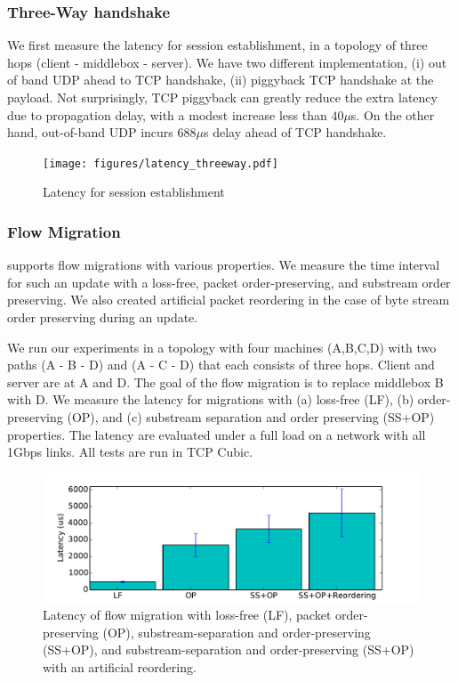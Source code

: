 \subsubsection{Three-Way handshake}
\label{sec:3way-handshake}

We first measure the latency for  session establishment, in a topology
of three  hops (client -  middlebox -  server). We have  two different
implementation, (i)  out of  band UDP  ahead   to TCP handshake,  (ii)
piggyback  TCP handshake   at  the   payload. Not surprisingly,    TCP
piggyback can   greatly reduce the extra    latency due to propagation
delay, with a modest increase less than $40 \mu $s. On the other hand,
out-of-band UDP incurs $688\mu$s delay ahead of TCP handshake.

\begin{figure}[ht]
\centering
\texttt{[image: figures/latency\_threeway.pdf]} 
\caption{\small Latency for session establishment}\label{threeway}
\end{figure}


\subsubsection{Flow Migration}

\system supports flow  migrations with various properties.  We measure
the time  interval for   such  an update   with a  loss-free,   packet
order-preserving,  and  substream order  preserving.  We  also created
artificial   packet  reordering in  the  case   of  byte stream  order
preserving during an update.


We run our experiments in a topology with four machines (A,B,C,D) with
two paths  (A - B -  D) and (A  - C - D)  that  each consists of three
hops. Client and server are at A and D. The goal of the flow migration
is   to replace  middlebox B   with  D. We   measure  the latency  for
migrations with (a) loss-free (LF), (b) order-preserving (OP), and (c)
substream separation   and order  preserving  (SS+OP)  properties. The
latency are  evaluated under a full  load on a  network with all 1Gbps
links. All tests are run in TCP Cubic.

\begin{figure}[ht]
\centering
\includegraphics[width=\linewidth]{figures/latency_four_types.pdf} 
\caption{\small Latency of flow migration with loss-free (LF), packet order-preserving (OP), substream-separation and order-preserving (SS+OP), and substream-separation and order-preserving (SS+OP) with an artificial reordering. }\label{fig_update_latency}
\end{figure}


